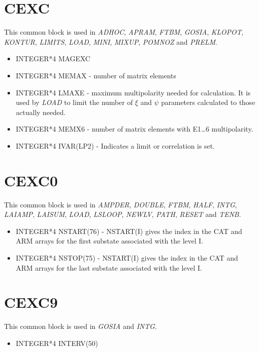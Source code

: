 \section{CEXC}

This common block is used in \emph{ADHOC}, \emph{APRAM}, \emph{FTBM}, \emph{
GOSIA}, \emph{KLOPOT}, \emph{KONTUR}, \emph{LIMITS}, \emph{LOAD}, \emph{MINI},
\emph{MIXUP}, \emph{POMNOZ} and \emph{PRELM}.

\begin{itemize}
\item INTEGER*4 MAGEXC
\item INTEGER*4 MEMAX - number of matrix elements
\item INTEGER*4 LMAXE - maximum multipolarity needed for calculation. It is
used by \emph{LOAD} to limit the number of $\xi$ and $\psi$ parameters
calculated to those actually needed.
\item INTEGER*4 MEMX6 - number of matrix elements with E1{\ldots}6
multipolarity.
\item INTEGER*4 IVAR(LP2) - Indicates a limit or correlation is set.
\end{itemize}

\section{CEXC0}

This common block is used in \emph{AMPDER}, \emph{DOUBLE}, \emph{FTBM}, \emph{
HALF}, \emph{INTG}, \emph{LAIAMP}, \emph{LAISUM}, \emph{LOAD}, \emph{LSLOOP},
\emph{NEWLV}, \emph{PATH}, \emph{RESET} and \emph{TENB}.

\begin{itemize}
\item INTEGER*4 NSTART(76) - NSTART(I) gives the index in the CAT and ARM
arrays for the first substate associated with the level I.
\item INTEGER*4 NSTOP(75) - NSTART(I) gives the index in the CAT and ARM
arrays for the last substate associated with the level I.
\end{itemize}

\section{CEXC9}

This common block is used in \emph{GOSIA} and \emph{INTG}.

\begin{itemize}
\item INTEGER*4 INTERV(50)
\end{itemize}

